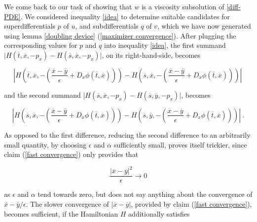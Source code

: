 		 We come back to our task of showing that $ w $ is a viscosity subsolution of \ref{diff-PDE}. We considered inequality \ref{idea} to determine suitable candidates for superdifferentials $ p $ of $ u $, and subdifferentials $ q $ of $ v $, which we have now generated using lemma \ref{doubling device} (\ref{maximizer convergence}). After plugging the corresponding values for $ p $ and $ q $ into inequality \ref{idea}, the first summand $ \lvert H(\overline{t}, \overline{x}, -p_x) - H(\overline{s}, \overline{x}, -p_x) \rvert $, on its right-hand-side, becomes
		 
		 \begin{equation*}
		 	\left\lvert H \left( \overline{t}, \overline{x}, - \left( \frac{\overline{x} - \overline{y}}{\epsilon} + D_x \phi (\overline{t}, \overline{x}) \right) \right) - H \left( \overline{s}, \overline{x}, - \left( \frac{\overline{x} - \overline{y}}{\epsilon} + D_x \phi (\overline{t}, \overline{x}) \right) \right) \right\rvert \,
		 \end{equation*}
		  
		  and the second summand $ \lvert H(\overline{s}, \overline{x}, -p_x) - H(\overline{s}, \overline{y}, -p_x) \rvert $, becomes
		  
		  \begin{equation*}
		  	\left\lvert H \left( \overline{s}, \overline{x}, - \left( \frac{\overline{x} - \overline{y}}{\epsilon} + D_x \phi (\overline{t}, \overline{x}) \right) \right) - H \left( \overline{s}, \overline{y}, - \left( \frac{\overline{x} - \overline{y}}{\epsilon} + D_x \phi (\overline{t}, \overline{x}) \right) \right) \right\rvert \ . 
		  \end{equation*}
		 
		  As opposed to the first difference, reducing the second difference to an arbitrarily small quantity, by choosing $ \epsilon $ and $ \alpha $  sufficiently small, proves itself trickier, since claim (\ref{fast convergence}) only provides that
		  
		  \begin{equation*}
		  	\frac{\lvert \overline{x} - \overline{y} \rvert^2}{\epsilon} \to 0
		  \end{equation*}
		  
		  as $ \epsilon $ and $ \alpha $ tend towards zero, but does not say anything about the convergence of $ \overline{x} - \overline{y} / \epsilon $. The slower convergence of $ \lvert \overline{x} - \overline{y} \rvert $, provided by claim (\ref{fast convergence}), becomes sufficient, if the Hamiltonian $ H $ additionally satisfies
		  
